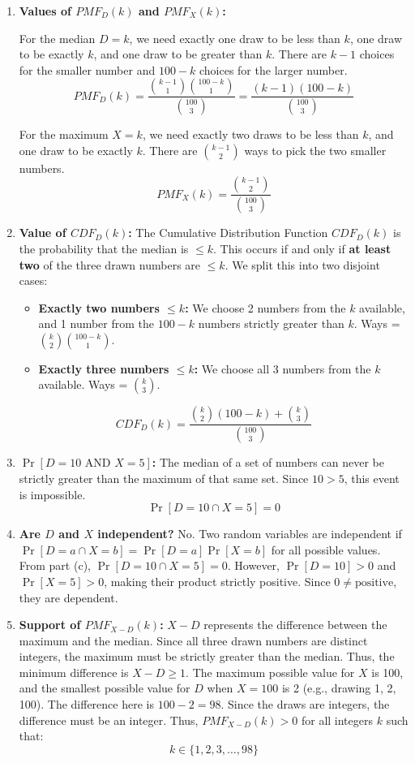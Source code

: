 \documentclass[11pt]{article}
\begin{document}
\begin{enumerate}[label=\textbf{(\alph*)}]
    \item \textbf{Values of $PMF_D(k)$ and $PMF_X(k)$:}
    
    For the median $D = k$, we need exactly one draw to be less than $k$, one draw to be exactly $k$, and one draw to be greater than $k$. 
    There are $k-1$ choices for the smaller number and $100-k$ choices for the larger number.
    $$ PMF_D(k) = \frac{\binom{k-1}{1} \binom{100-k}{1}}{\binom{100}{3}} = \frac{(k-1)(100-k)}{\binom{100}{3}} $$
    
    For the maximum $X = k$, we need exactly two draws to be less than $k$, and one draw to be exactly $k$.
    There are $\binom{k-1}{2}$ ways to pick the two smaller numbers.
    $$ PMF_X(k) = \frac{\binom{k-1}{2}}{\binom{100}{3}} $$

    \item \textbf{Value of $CDF_D(k)$:}
    The Cumulative Distribution Function $CDF_D(k)$ is the probability that the median is $\le k$. This occurs if and only if \textbf{at least two} of the three drawn numbers are $\le k$. We split this into two disjoint cases:
    \begin{itemize}
        \item \textbf{Exactly two numbers $\le k$:} We choose 2 numbers from the $k$ available, and 1 number from the $100-k$ numbers strictly greater than $k$. Ways = $\binom{k}{2}\binom{100-k}{1}$.
        \item \textbf{Exactly three numbers $\le k$:} We choose all 3 numbers from the $k$ available. Ways = $\binom{k}{3}$.
    \end{itemize}
    $$ CDF_D(k) = \frac{\binom{k}{2}(100-k) + \binom{k}{3}}{\binom{100}{3}} $$

    \item \textbf{$\Pr[D = 10 \text{ AND } X = 5]$:}
    The median of a set of numbers can never be strictly greater than the maximum of that same set. Since $10 > 5$, this event is impossible.
    $$ \Pr[D = 10 \cap X = 5] = 0 $$

    \item \textbf{Are $D$ and $X$ independent?}
    No. Two random variables are independent if $\Pr[D=a \cap X=b] = \Pr[D=a]\Pr[X=b]$ for all possible values. 
    From part (c), $\Pr[D=10 \cap X=5] = 0$. However, $\Pr[D=10] > 0$ and $\Pr[X=5] > 0$, making their product strictly positive. Since $0 \neq \text{positive}$, they are dependent.

    \item \textbf{Support of $PMF_{X-D}(k)$:}
    $X - D$ represents the difference between the maximum and the median. Since all three drawn numbers are distinct integers, the maximum must be strictly greater than the median. Thus, the minimum difference is $X - D \ge 1$.
    The maximum possible value for $X$ is 100, and the smallest possible value for $D$ when $X=100$ is 2 (e.g., drawing 1, 2, 100). The difference here is $100 - 2 = 98$.
    Since the draws are integers, the difference must be an integer. Thus, $PMF_{X-D}(k) > 0$ for all integers $k$ such that:
    $$ k \in \{1, 2, 3, \dots, 98\} $$
\end{enumerate}
\end{document}
